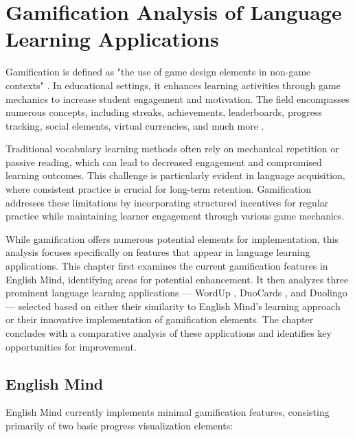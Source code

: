 \chapter{Gamification Analysis of Language Learning Applications}
\label{chap:gamification-analysis}

Gamification is defined as "the use of game design elements in non-game contexts" \cite{cite:deterding2011_gamefulness}. In educational settings, it enhances learning activities through game mechanics to increase student engagement and motivation. The field encompasses numerous concepts, including streaks, achievements, leaderboards, progress tracking, social elements, virtual currencies, and much more \cite{cite:govender2021_gamification_elements_in_language_learning_apps}.

Traditional vocabulary learning methods often rely on mechanical repetition or passive reading, which can lead to decreased engagement and compromised learning outcomes. This challenge is particularly evident in language acquisition, where consistent practice is crucial for long-term retention. Gamification addresses these limitations by incorporating structured incentives for regular practice while maintaining learner engagement through various game mechanics.

While gamification offers numerous potential elements for implementation, this analysis focuses specifically on features that appear in language learning applications. This chapter first examines the current gamification features in English Mind, identifying areas for potential enhancement. It then analyzes three prominent language learning applications — WordUp \cite{cite:wordup}, DuoCards \cite{cite:duocards}, and Duolingo \cite{cite:duolingo} — selected based on either their similarity to English Mind's learning approach or their innovative implementation of gamification elements. The chapter concludes with a comparative analysis of these applications and identifies key opportunities for improvement.\newpage

\section{English Mind}

English Mind currently implements minimal gamification features, consisting primarily of two basic progress visualization elements:

